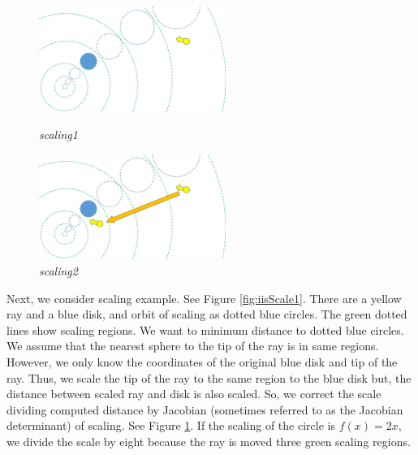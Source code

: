 \begin{figure}[htbp]
 \begin{minipage}[t]{0.5\hsize}
  \center
  \includegraphics[height=1.35in, keepaspectratio]{img/preparation/iis3d/scaleIIS.png}
  \caption{\textit{scaling1}}
  \label{fig:iisScale1}
  \hspace*{\fill}
 \end{minipage}
 \begin{minipage}[t]{0.5\hsize}
  \center
  \includegraphics[height=1.35in, keepaspectratio]{img/preparation/iis3d/scaleIIS2.png}
  \caption{\textit{scaling2}}
  \label{fig:iisScale2}
  \hspace*{\fill}
 \end{minipage}
\end{figure}

Next, we consider scaling example. See Figure \ref{fig:iisScale1}.
There are a yellow ray and a blue disk, and orbit of scaling as
dotted blue circles.
The green dotted lines show scaling regions.
We want to minimum distance to dotted blue circles.
We assume that the nearest sphere to the tip of the ray is in
same regions. 
However, we only know the coordinates of the original blue
disk and tip of the ray.
Thus, we scale the tip of the ray to the same region to the blue disk
but, the distance between scaled ray and disk is also scaled.
So, we correct the scale dividing computed distance by 
Jacobian (sometimes referred to as the Jacobian determinant) of scaling.
See Figure \ref{fig:iisScale2}.
If the scaling of the circle is $f(x) = 2x$, we divide the scale by
eight because the ray is moved three green scaling regions.

